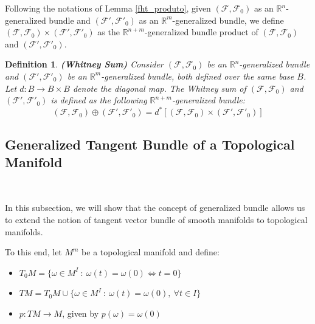 \documentclass[12pt,oneside]{book}
\newtheorem{defi}   {Definition}[chapter]
\newcommand{\R}{\mathbb{R}}
\begin{document}
    Following the notations of Lemma \ref{fht_produto}, given $(\mathcal{F},\mathcal{F}_{0})$ as an $\R^{n}$-generalized bundle and 
    $(\mathcal{F'},\mathcal{F'}_{0})$ as an $\R^{m}$-generalized bundle, we define 
    $(\mathcal{F},\mathcal{F}_{0})\times(\mathcal{F'},\mathcal{F'}_{0})$ as the $\R^{n+m}$-generalized bundle 
    product of $(\mathcal{F},\mathcal{F}_{0})$ and $(\mathcal{F'},\mathcal{F'}_{0})$.

    \begin{defi}{\bf (Whitney Sum)}
        Consider $(\mathcal{F},\mathcal{F}_{0})$ be an $\R^{n}$-generalized bundle and $(\mathcal{F'},\mathcal{F'}_{0})$ be an 
        $\R^{m}$-generalized bundle, both defined over the same base $B$. Let $d:B \to B \times B$ denote the diagonal map. The 
        Whitney sum of $(\mathcal{F},\mathcal{F}_{0})$ and 
        $(\mathcal{F'},\mathcal{F'}_{0})$ is defined as the following $\R^{n+m}$-generalized bundle:
        $$ (\mathcal{F},\mathcal{F}_{0}) \oplus (\mathcal{F'},\mathcal{F'}_{0}) = d^{*}[(\mathcal{F},\mathcal{F}_{0}) \times (\mathcal{F'},\mathcal{F'}_{0})] $$
    \end{defi}



    \subsection{Generalized Tangent Bundle of a Topological Manifold}\label{secao_fht_tang}

    \

    In this subsection, we will show that the concept of generalized bundle allows us to extend the notion of tangent vector 
    bundle of smooth manifolds to topological manifolds.

    To this end, let \( M^{m} \) be a topological manifold and define:
        \begin{itemize}
            \item \( T_{0}M = \{ \omega \in M^{I} \ : \ \omega(t) = \omega(0) \Leftrightarrow t = 0 \} \)
            \item \( TM = T_{0}M \cup \{ \omega \in M^{I} \ : \ \omega(t) = \omega(0), \ \forall t \in I \} \)
            \item \( p: TM \to M \), given by \( p(\omega) = \omega(0) \)
        \end{itemize}
    
\end{document}
